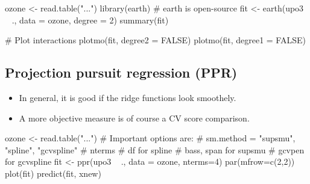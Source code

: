 \begin{code}
 ozone <- read.table("...")
 library(earth) # earth is open-source
 fit <- earth(upo3 ~ ., data = ozone, degree = 2)
 summary(fit)
 
 # Plot interactions
 plotmo(fit, degree2 = FALSE)
 plotmo(fit, degree1 = FALSE)
\end{code}


\subsection{Projection pursuit regression (PPR)}
\begin{application}
 \begin{itemize}
  \item In general, it is good if the ridge functions look smoothely.
  \item A more objective measure is of course a CV score comparison.
 \end{itemize}
\end{application}

\begin{code}
 ozone <- read.table("...")
 # Important options are:
 # sm.method = {"supsmu", "spline", "gcvspline"}
 # nterms
 # df for spline
 # bass, span for supsmu
 # gcvpen for gcvspline
 fit <- ppr(upo3 ~ ., data = ozone, nterms=4)
 par(mfrow=c(2,2))
 plot(fit)
 predict(fit, xnew)
\end{code}